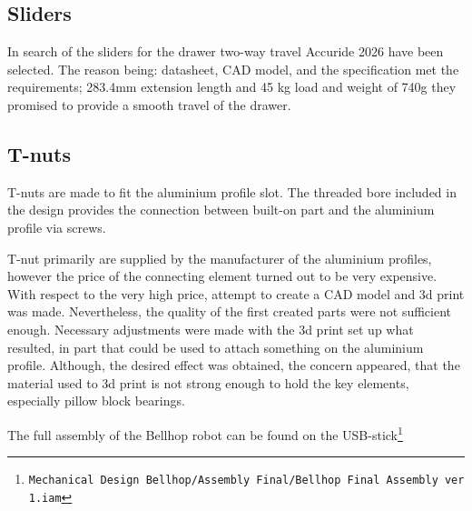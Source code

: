 \documentclass[11pt]{article}
\begin{document}
\subsection*{Sliders}
In search of the sliders for the drawer two-way travel Accuride 2026 have been selected. The reason being: datasheet, CAD model, and the specification met the requirements; 283.4mm extension length and 45 kg load and weight of 740g they promised to provide a smooth travel of the drawer.


\subsection*{T-nuts}
T-nuts are made to fit the aluminium profile slot. The threaded bore included in the design provides the connection between built-on part and the aluminium profile via screws.


T-nut primarily are supplied by the manufacturer of the aluminium profiles, however the price of the connecting element turned out to be very expensive. With respect to the very high price, attempt to create a CAD model and 3d print was made. Nevertheless, the quality of the first created parts were not sufficient enough. Necessary adjustments were made with the 3d print set up what resulted, in part that could be used to attach something on the aluminium profile. Although, the desired effect was obtained, the concern appeared, that the material used to 3d print is not strong enough to hold the key elements, especially pillow block bearings.

The full assembly of the Bellhop robot can be found on the USB-stick\footnote{\texttt{Mechanical Design Bellhop/Assembly Final/Bellhop Final Assembly ver 1.iam}}
\end{document}
